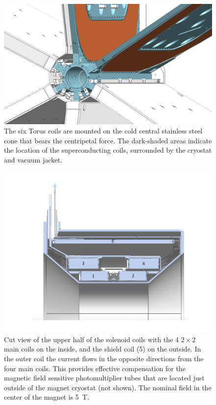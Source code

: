 \documentclass[final,3p,twocolumn]{elsarticle}
\begin{document}
\begin{figure}[htbp!]
\centerline{\includegraphics[width=1.00\columnwidth]{torus-hub-2.png}}
\caption{The six Torus coils are mounted on the cold central stainless steel cone that bears the centripetal force. The
dark-shaded areas indicate the location of the superconducting coils, surrounded by the cryostat and vacuum jacket.}
\label{coil-mount}
\end{figure}

\begin{figure}[htbp!]
\centerline{\includegraphics[width=1.3\columnwidth]{Solenoid.pdf}}
\caption{Cut view of the upper half of the solenoid coils with the 4 $2 \times 2$ main coils on the inside, and the shield coil
(5) on the outside. In the outer coil the current flows in the opposite directions from the four main coils. This provides
effective compensation for the magnetic field sensitive photomultiplier tubes that are located just outside of the magnet
cryostat (not shown). The nominal field in the center of the magnet is 5~T.}
\label{solenoid-coils}
\end{figure}
\end{document}
